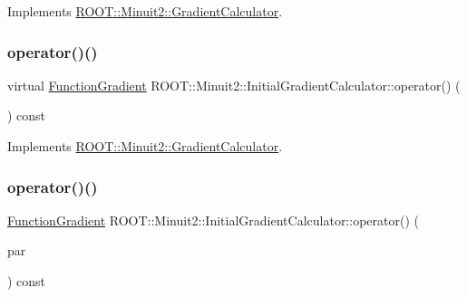 Implements \mbox{\hyperlink{classROOT_1_1Minuit2_1_1GradientCalculator_a1bae913e96ffc9ece28664a5f6f79cb0}{R\+O\+O\+T\+::\+Minuit2\+::\+Gradient\+Calculator}}.

\mbox{\label{classROOT_1_1Minuit2_1_1InitialGradientCalculator_ae3f248b2e9e40bc62ee7dc68c8ee010f}} 
\subsubsection{\texorpdfstring{operator()()}{operator()()}\hspace{0.1cm}{\footnotesize\ttfamily [2/6]}}
{\footnotesize\ttfamily virtual \mbox{\hyperlink{classROOT_1_1Minuit2_1_1FunctionGradient}{Function\+Gradient}} R\+O\+O\+T\+::\+Minuit2\+::\+Initial\+Gradient\+Calculator\+::operator() (\begin{DoxyParamCaption}\item[{const \mbox{\hyperlink{classROOT_1_1Minuit2_1_1MinimumParameters}{Minimum\+Parameters}} \&}]{ }\end{DoxyParamCaption}) const\hspace{0.3cm}{\ttfamily [virtual]}}



Implements \mbox{\hyperlink{classROOT_1_1Minuit2_1_1GradientCalculator_a1bae913e96ffc9ece28664a5f6f79cb0}{R\+O\+O\+T\+::\+Minuit2\+::\+Gradient\+Calculator}}.

\mbox{\label{classROOT_1_1Minuit2_1_1InitialGradientCalculator_afae3b02315c3ed44cdd94dff4bd53462}} 
\subsubsection{\texorpdfstring{operator()()}{operator()()}\hspace{0.1cm}{\footnotesize\ttfamily [3/6]}}
{\footnotesize\ttfamily \mbox{\hyperlink{classROOT_1_1Minuit2_1_1FunctionGradient}{Function\+Gradient}} R\+O\+O\+T\+::\+Minuit2\+::\+Initial\+Gradient\+Calculator\+::operator() (\begin{DoxyParamCaption}\item[{const \mbox{\hyperlink{classROOT_1_1Minuit2_1_1MinimumParameters}{Minimum\+Parameters}} \&}]{par }\end{DoxyParamCaption}) const\hspace{0.3cm}{\ttfamily [virtual]}}



